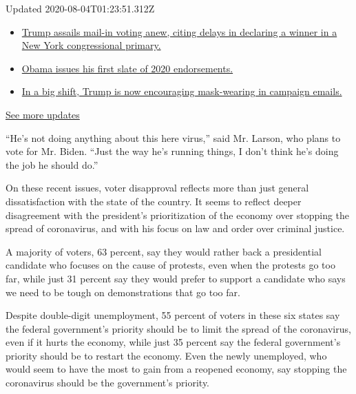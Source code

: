 Updated 2020-08-04T01:23:51.312Z

\begin{itemize}
\tightlist
\item
  \href{https://www.nytimes3xbfgragh.onion/2020/08/03/us/elections/biden-vs-trump.html?action=click\&pgtype=Article\&state=default\&region=MAIN_CONTENT_1\&context=storylines_live_updates\#link-6494b448}{Trump
  assails mail-in voting anew, citing delays in declaring a winner in a
  New York congressional primary.}
\item
  \href{https://www.nytimes3xbfgragh.onion/2020/08/03/us/elections/biden-vs-trump.html?action=click\&pgtype=Article\&state=default\&region=MAIN_CONTENT_1\&context=storylines_live_updates\#link-3de249e6}{Obama
  issues his first slate of 2020 endorsements.}
\item
  \href{https://www.nytimes3xbfgragh.onion/2020/08/03/us/elections/biden-vs-trump.html?action=click\&pgtype=Article\&state=default\&region=MAIN_CONTENT_1\&context=storylines_live_updates\#link-54e34d20}{In
  a big shift, Trump is now encouraging mask-wearing in campaign
  emails.}
\end{itemize}

\href{https://www.nytimes3xbfgragh.onion/2020/08/03/us/elections/biden-vs-trump.html?action=click\&pgtype=Article\&state=default\&region=MAIN_CONTENT_1\&context=storylines_live_updates}{See
more updates}

``He's not doing anything about this here virus,'' said Mr. Larson, who
plans to vote for Mr. Biden. ``Just the way he's running things, I don't
think he's doing the job he should do.''

On these recent issues, voter disapproval reflects more than just
general dissatisfaction with the state of the country. It seems to
reflect deeper disagreement with the president's prioritization of the
economy over stopping the spread of coronavirus, and with his focus on
law and order over criminal justice.

A majority of voters, 63 percent, say they would rather back a
presidential candidate who focuses on the cause of protests, even when
the protests go too far, while just 31 percent say they would prefer to
support a candidate who says we need to be tough on demonstrations that
go too far.

Despite double-digit unemployment, 55 percent of voters in these six
states say the federal government's priority should be to limit the
spread of the coronavirus, even if it hurts the economy, while just 35
percent say the federal government's priority should be to restart the
economy. Even the newly unemployed, who would seem to have the most to
gain from a reopened economy, say stopping the coronavirus should be the
government's priority.

